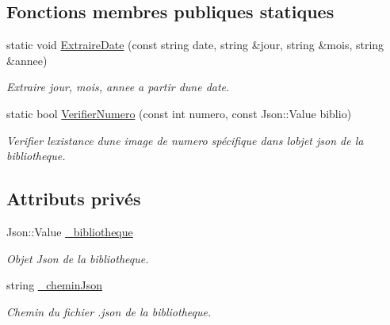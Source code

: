 \subsection*{Fonctions membres publiques statiques}
\begin{DoxyCompactItemize}
\item 
static void \hyperlink{classBibliotheque_af2649bd20b0cf9cd35165abee4a45a12}{Extraire\+Date} (const string date, string \&jour, string \&mois, string \&annee)
\begin{DoxyCompactList}\small\item\em Extraire jour, mois, annee a partir d\textquotesingle{}une date. \end{DoxyCompactList}\item 
static bool \hyperlink{classBibliotheque_a66606b7018ddd339af2a608ea4e6de9c}{Verifier\+Numero} (const int numero, const Json\+::\+Value biblio)
\begin{DoxyCompactList}\small\item\em Verifier l\textquotesingle{}existance d\textquotesingle{}une image de numero spécifique dans l\textquotesingle{}objet json de la bibliotheque. \end{DoxyCompactList}\end{DoxyCompactItemize}
\subsection*{Attributs privés}
\begin{DoxyCompactItemize}
\item 
\mbox{\label{classBibliotheque_a15a693b9eedd442d0cc00489b5ea6e5e}} 
Json\+::\+Value \hyperlink{classBibliotheque_a15a693b9eedd442d0cc00489b5ea6e5e}{\+\_\+bibliotheque}
\begin{DoxyCompactList}\small\item\em Objet Json de la bibliotheque. \end{DoxyCompactList}\item 
\mbox{\label{classBibliotheque_a9628b7dc59bbb3894c17634addc8016a}} 
string \hyperlink{classBibliotheque_a9628b7dc59bbb3894c17634addc8016a}{\+\_\+chemin\+Json}
\begin{DoxyCompactList}\small\item\em Chemin du fichier .json de la bibliotheque. \end{DoxyCompactList}\end{DoxyCompactItemize}


